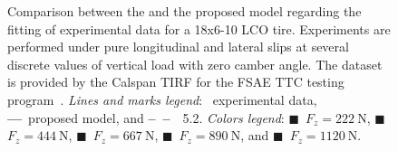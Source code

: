 \begin{figure}[htb]
\begin{minipage}[c]{0.29\linewidth}
  \end{minipage}
  \caption{Comparison between the \MagicFormulae{} and the proposed model regarding the fitting of experimental data for a \Hoosier{} 18x6-10 LCO tire. Experiments are performed under pure longitudinal and lateral slips at several discrete values of vertical load with zero camber angle. The dataset is provided by the Calspan \ac{TIRF} for the \ac{FSAE} \ac{TTC} testing program~\cite{kasprzak2006formula}. \emph{Lines and marks legend}: \textbullet~experimental data, \textbf{---}~proposed model, and \textbf{--~--}~\MagicFormulae{}~5.2. \emph{Colors legend}: \textcolor{mycolor1}{$\blacksquare$}~$F_z = \SI{222}{\newton}$, \textcolor{mycolor2}{$\blacksquare$}~$F_z = \SI{444}{\newton}$, \textcolor{mycolor3}{$\blacksquare$}~$F_z = \SI{667}{\newton}$, \textcolor{mycolor4}{$\blacksquare$}~$F_z = \SI{890}{\newton}$, and \textcolor{mycolor5}{$\blacksquare$}~$F_z = \SI{1120}{\newton}$.}
  \label{app3:fig:fsae_pure}
\end{figure}


